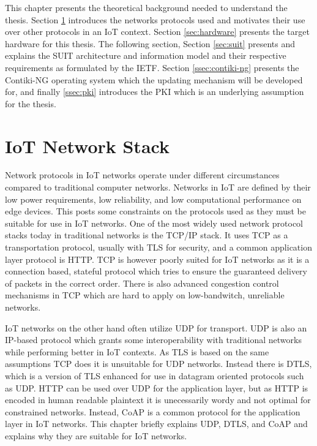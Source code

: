 \documentclass[0-thesis.tex]{subfiles}
\begin{document}
This chapter presents the theoretical background needed to understand the thesis. Section
\ref{sec:network} introduces the networks protocols used and motivates their use over
other protocols in an IoT context. Section \ref{sec:hardware} presents the target hardware
for this thesis. The following section, Section \ref{sec:suit} presents and explains the
SUIT architecture and information model and their respective requirements as formulated by
the IETF. Section \ref{ssec:contiki-ng} presents the Contiki-NG operating system which the
updating mechanism will be developed for, and finally \ref{ssec:pki} introduces the PKI
which is an underlying assumption for the thesis.

\section{IoT Network Stack}
\label{sec:network}
Network protocols in IoT networks operate under different circumstances compared to
traditional computer networks. Networks in IoT are defined by their low power
requirements, low reliability, and low computational performance on edge devices. This
posts some constraints on the protocols used as they must be suitable for use in IoT
networks. One of the most widely used network protocol stacks today in traditional
networks is the TCP/IP stack. It uses TCP as a transportation protocol, usually with TLS
for security, and a common application layer protocol is HTTP. TCP is however poorly
suited for IoT networks as it is a connection based, stateful protocol which tries to
ensure the guaranteed delivery of packets in the correct order. There is also advanced
congestion control mechanisms in TCP which are hard to apply on low-bandwitch, unreliable
networks.

IoT networks on the other hand often utilize UDP for transport. UDP is also an IP-based
protocol which grants some interoperability with traditional networks while performing
better in IoT contexts. As TLS is based on the same assumptions TCP does it is unsuitable
for UDP networks. Instead there is DTLS, which is a version of TLS enhanced for use in
datagram oriented protocols such as UDP. HTTP can be used over UDP for the application
layer, but as HTTP is encoded in human readable plaintext it is unecessarily wordy and not
optimal for constrained networks. Instead, CoAP is a common protocol for the application
layer in IoT networks. This chapter briefly explains UDP, DTLS, and CoAP and explains why
they are suitable for IoT networks.
\end{document}
